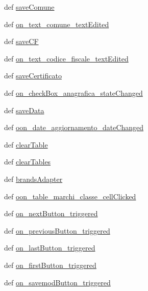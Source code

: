 \begin{DoxyCompactItemize}
def \hyperlink{classmmasgis_1_1anagrafica_1_1MainWindowAnagrafica_ac84d78705e09d651dc9b0d8bdedb00cc}{saveComune}
\item 
def \hyperlink{classmmasgis_1_1anagrafica_1_1MainWindowAnagrafica_a985991b02db6d1194cbd958a7f48d0a0}{on\_\-text\_\-comune\_\-textEdited}
\item 
def \hyperlink{classmmasgis_1_1anagrafica_1_1MainWindowAnagrafica_a858655bb07c0de357b41ab90ade3d0a2}{saveCF}
\item 
def \hyperlink{classmmasgis_1_1anagrafica_1_1MainWindowAnagrafica_a70850592a5d9b55fd29e84ae42d407ee}{on\_\-text\_\-codice\_\-fiscale\_\-textEdited}
\item 
def \hyperlink{classmmasgis_1_1anagrafica_1_1MainWindowAnagrafica_afad8c34fab61ac0526b10d6d92525267}{saveCertificato}
\item 
def \hyperlink{classmmasgis_1_1anagrafica_1_1MainWindowAnagrafica_a71bfc9b0fb35185892d153fbdb2b3c43}{on\_\-checkBox\_\-anagrafica\_\-stateChanged}
\item 
def \hyperlink{classmmasgis_1_1anagrafica_1_1MainWindowAnagrafica_afc9de09671e821e03256d8a9a87cded3}{saveData}
\item 
def \hyperlink{classmmasgis_1_1anagrafica_1_1MainWindowAnagrafica_a7f37b2cd2f02bce9284cc5e27fee7a2c}{oon\_\-date\_\-aggiornamento\_\-dateChanged}
\item 
def \hyperlink{classmmasgis_1_1anagrafica_1_1MainWindowAnagrafica_a7b398a6b47690e119a769094af24207c}{clearTable}
\item 
def \hyperlink{classmmasgis_1_1anagrafica_1_1MainWindowAnagrafica_ad01082321cf740c7e18cf0dbee2daea7}{clearTables}
\item 
def \hyperlink{classmmasgis_1_1anagrafica_1_1MainWindowAnagrafica_aeb01a8738ef79c47584c99622ba43364}{brandsAdapter}
\item 
def \hyperlink{classmmasgis_1_1anagrafica_1_1MainWindowAnagrafica_a8a3198d8cdc1911569718d46ad85a607}{oon\_\-table\_\-marchi\_\-classe\_\-cellClicked}
\item 
def \hyperlink{classmmasgis_1_1anagrafica_1_1MainWindowAnagrafica_a76a7b6936d112bb0109e29cfe1a8f260}{on\_\-nextButton\_\-triggered}
\item 
def \hyperlink{classmmasgis_1_1anagrafica_1_1MainWindowAnagrafica_a998e66aedede53e93be7d775a320e9b9}{on\_\-previousButton\_\-triggered}
\item 
def \hyperlink{classmmasgis_1_1anagrafica_1_1MainWindowAnagrafica_ac440f07b2ca733eb31220242ec478772}{on\_\-lastButton\_\-triggered}
\item 
def \hyperlink{classmmasgis_1_1anagrafica_1_1MainWindowAnagrafica_a2495f0c80ab810f1acb50899c30da862}{on\_\-firstButton\_\-triggered}
\item 
def \hyperlink{classmmasgis_1_1anagrafica_1_1MainWindowAnagrafica_a63d5b9056218c459c4d59952e9b5f789}{on\_\-savemodButton\_\-triggered}
\end{DoxyCompactItemize}
